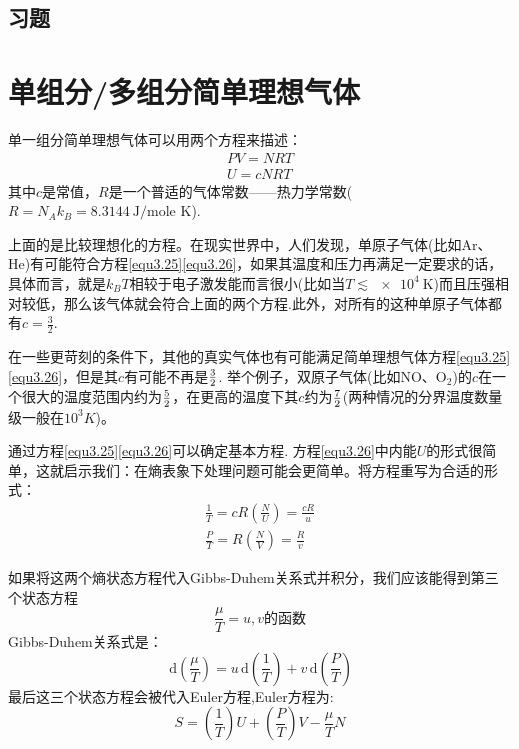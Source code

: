 \subsection*{习题}


\section{单组分/多组分简单理想气体}
\label{sec3.4}

单一组分简单理想气体可以用两个方程来描述：
\begin{align}
PV=NRT \label{equ3.25}\\
U=cNRT \label{equ3.26}
\end{align}
其中$c$是常值，$R$是一个普适的气体常数——热力学常数($R=N_Ak_B=8.3144\ \text{J/mole K}$).

上面的是比较理想化的方程。在现实世界中，人们发现，单原子气体(比如Ar、He)有可能符合方程\eqref{equ3.25}\eqref{equ3.26}，如果其温度和压力再满足一定要求的话，具体而言，就是$k_BT$相较于电子激发能而言很小(比如当$T\lesssim \SI{e4}{\kelvin}$)而且压强相对较低，那么该气体就会符合上面的两个方程.此外，对所有的这种单原子气体都有$c=\frac{3}{2}$.

在一些更苛刻的条件下，其他的真实气体也有可能满足简单理想气体方程\eqref{equ3.25}\eqref{equ3.26}，但是其$c$有可能不再是$3\over2$. 举个例子，双原子气体(比如NO、O$_2$)的$c$在一个很大的温度范围内约为${5\over2}$，在更高的温度下其$c$约为$7\over2$(两种情况的分界温度数量级一般在$10^3K$)。

通过方程\eqref{equ3.25}\eqref{equ3.26}可以确定基本方程. 方程\eqref{equ3.26}中内能$U$的形式很简单，这就启示我们：在熵表象下处理问题可能会更简单。将方程重写为合适的形式：
\begin{align}
\frac{1}{T}=cR\left(\frac{N}{U}\right)=\frac{cR}{u}\label{equ3.27}\\
\frac{P}{T}=R\left(\frac{N}{V}\right)=\frac{R}{v}\label{equ3.28}
\end{align}

如果将这两个熵状态方程代入Gibbs-Duhem关系式并积分，我们应该能得到第三个状态方程
\begin{equation}
\label{equ3.29}
\frac{\mu}{T}=u,v\text{的函数}
\end{equation}
Gibbs-Duhem关系式是：
\begin{equation}
\label{equ3.30}
\,\text{d}\left(\frac{\mu}{T}\right)=u\,\text{d}\left(\frac{1}{T}\right)+v\,\text{d}\left(\frac{P}{T}\right)
\end{equation}
最后这三个状态方程会被代入Euler方程,Euler方程为:
\begin{equation}
\label{equ3.31}
S = \left( \frac{1}{T} \right) U + \left( \frac{P}{T} \right) V - \frac{\mu}{T} N
\end{equation}

